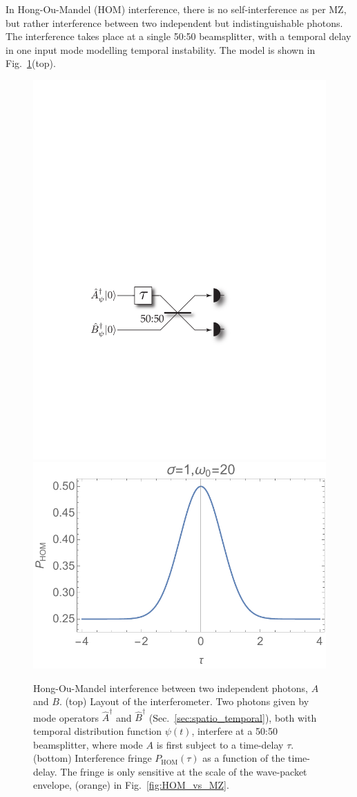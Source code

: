 \documentclass[aps, rmp, twocolumn, amsmath, amssymb, nofootinbib, superscriptaddress, longbibliography, floatfix, table-of-contents, eqsecnum]{revtex4-1}
\begin{document}
In Hong-Ou-Mandel (HOM) interference, there is no self-interference as per MZ, but rather interference between two independent but indistinguishable photons. The interference takes place at a single 50:50 beamsplitter, with a temporal delay in one input mode modelling temporal instability. The model is shown in Fig.~\ref{fig:HOM_inter}(top).

\begin{figure}[!htb]
	\includegraphics[width=0.63\columnwidth]{HOM_setup} \\
	\includegraphics[width=\columnwidth]{HOM}
	\caption{Hong-Ou-Mandel interference between two independent photons, $A$ and $B$. (top) Layout of the interferometer. Two photons given by mode operators $\hat{A}^\dag$ and $\hat{B}^\dag$ (Sec.~\ref{sec:spatio_temporal}), both with temporal distribution function $\psi(t)$, interfere at a 50:50 beamsplitter, where mode $A$ is first subject to a time-delay $\tau$. (bottom) Interference fringe $P_\text{HOM}(\tau)$ as a function of the time-delay. The fringe is only sensitive at the scale of the wave-packet envelope, (orange) in Fig.~\ref{fig:HOM_vs_MZ}.} \label{fig:HOM_inter}
\end{figure}
\end{document}

